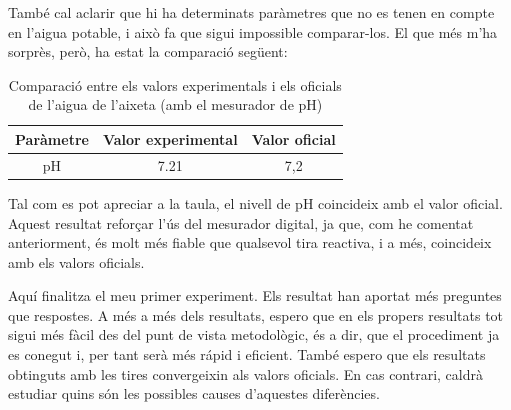 També cal aclarir que hi ha determinats paràmetres que no es tenen en compte en l’aigua potable, i això fa que sigui impossible comparar-los. El que més m’ha sorprès, però, ha estat la comparació següent:

\begin{table}[h!]
\centering
\begin{tabular}{|c|c|c|}
\hline
\textbf{Paràmetre} & \textbf{Valor experimental} & \textbf{Valor oficial} \\
\hline \hline
pH & 7.21 & 7,2 \\
\hline
\end{tabular}
\caption{Comparació entre els valors experimentals i els oficials de l'aigua de l'aixeta (amb el mesurador de pH)}
\label{tab:comparacio_aigua_sense_sol}
\end{table}

Tal com es pot apreciar a la taula, el nivell de pH coincideix amb el valor oficial. Aquest resultat reforçar l'ús del mesurador digital, ja que, com he comentat anteriorment, és molt més fiable que qualsevol tira reactiva, i a més, coincideix amb els valors oficials.

Aquí finalitza el meu primer experiment. Els resultat han aportat més preguntes que respostes. A més a més dels resultats, espero que en els propers resultats tot sigui més fàcil des del punt de vista metodològic, és a dir, que el procediment ja es conegut i, per tant serà més rápid i eficient. També espero que els resultats obtinguts amb les tires convergeixin als valors oficials. En cas contrari, caldrà estudiar quins són les possibles causes d'aquestes diferències.
